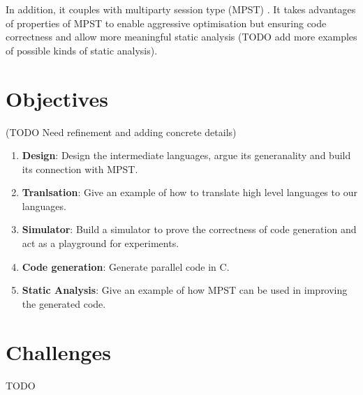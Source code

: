 In addition, it couples with multiparty session type (MPST) \cite{coppoGentleIntroductionMultiparty2015}. It takes advantages of properties of MPST to enable aggressive optimisation but ensuring code correctness and allow more meaningful static analysis (TODO add more examples of possible kinds of static analysis).

\section{Objectives}
(TODO Need refinement and adding concrete details)
\begin{enumerate}
\item \textbf{Design}: Design the intermediate languages, argue its generanality and build its connection with MPST. 
\item \textbf{Tranlsation}: Give an example of how to translate high level languages to our languages. 
\item \textbf{Simulator}: Build a simulator to prove the correctness of code generation and act as a playground for experiments.
\item \textbf{Code generation}: Generate parallel code in C.
\item \textbf{Static Analysis}: Give an example of how MPST can be used in improving the generated code.
\end{enumerate}
\section{Challenges}
TODO
